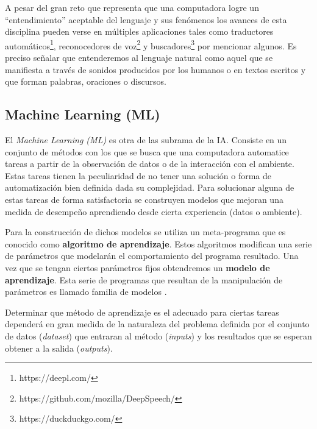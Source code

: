 \documentclass[letterpaper,12pt,oneside]{book}
\newcommand{\note}[4][]{\todo[author=#2,color=#3,size=\scriptsize,fancyline,caption={},#1]{#4}} %
\newcommand{\diego}[2][]{\note[#1]{Diego}{blue!40}{#2}}
\theoremstyle{definition}
\begin{document}
A pesar del gran reto que representa que una computadora logre un ``entendimiento'' aceptable del lenguaje y sus fenómenos los avances de esta disciplina pueden verse en múltiples aplicaciones tales como traductores automáticos\footnote{https://deepl.com/}, reconocedores de voz\footnote{https://github.com/mozilla/DeepSpeech/} y buscadores\footnote{https://duckduckgo.com/} por mencionar algunos. Es preciso señalar que entenderemos al lenguaje natural como aquel que se manifiesta a través de sonidos producidos por los humanos o en textos escritos y que forman palabras, oraciones o discursos.

\subsection{Machine Learning (ML)}

\diego{Reformular all}



El \textit{Machine Learning (ML)} es otra de las subrama de la IA. Consiste en un conjunto de métodos con los que se busca que una computadora automatice tareas a partir de la observación de datos o de la interacción con el ambiente.  Estas tareas tienen la peculiaridad de no tener una solución o forma de automatización bien definida dada su complejidad. Para solucionar alguna de estas tareas de forma satisfactoria se construyen modelos que mejoran una medida de desempeño aprendiendo desde cierta experiencia (datos o ambiente).

Para la construcción de dichos modelos se utiliza un meta-programa que es conocido como \textbf{algoritmo de aprendizaje}. Estos algoritmos modifican una serie de parámetros que modelarán el comportamiento del programa resultado. Una vez que se tengan ciertos parámetros fijos obtendremos un \textbf{modelo de aprendizaje}. Esta serie de programas que resultan de la manipulación de parámetros es llamado familia de modelos \citep{zhang2020dive}.

Determinar que método de aprendizaje es el adecuado para ciertas tareas dependerá en gran medida de la naturaleza del problema definida por el conjunto de datos (\textit{dataset}) que entraran al método (\textit{inputs}) y los resultados que se esperan obtener a la salida (\textit{outputs}). 
\end{document}
